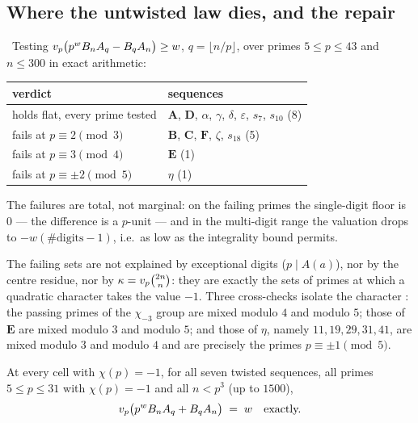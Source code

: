 \subsection{Where the untwisted law dies, and the repair}
\label{ssec:twist}

\begin{observation}\label{obs:naive-fail}
\Verified\ Testing $v_p\bigl(p^wB_nA_q-B_qA_n\bigr)\ge w$, $q=\lfloor n/p\rfloor$, over
primes $5\le p\le43$ and $n\le300$ in exact arithmetic:
\begin{center}\small
\begin{tabular}{@{}ll@{}}
\toprule
verdict & sequences\\
\midrule
holds flat, every prime tested & $\mathbf A$, $\mathbf D$, $\alpha$, $\gamma$, $\delta$, $\varepsilon$, $s_7$, $s_{10}$ \quad(8)\\
fails at $p\equiv2\pmod3$ & $\mathbf B$, $\mathbf C$, $\mathbf F$, $\zeta$, $s_{18}$ \quad(5)\\
fails at $p\equiv3\pmod4$ & $\mathbf E$ \quad(1)\\
fails at $p\equiv\pm2\pmod5$ & $\eta$ \quad(1)\\
\bottomrule
\end{tabular}
\end{center}
The failures are total, not marginal: on the failing primes the single-digit floor is $0$
--- the difference is a $p$-unit --- and in the multi-digit range the valuation drops to
$-w(\#\text{digits}-1)$, i.e.\ as low as the integrality bound permits.
\end{observation}

The failing sets are not explained by exceptional digits ($p\mid A(a)$), nor by the centre
residue, nor by $\kappa=v_p\binom{2n}{n}$: they are exactly the sets of primes at which a
quadratic character takes the value $-1$. Three cross-checks isolate the character
\Verified: the passing primes of the $\chi_{-3}$ group are mixed modulo $4$ and modulo
$5$; those of $\mathbf E$ are mixed modulo $3$ and modulo $5$; and those of $\eta$, namely
$11,19,29,31,41$, are mixed modulo $3$ and modulo $4$ and are precisely the primes
$p\equiv\pm1\pmod 5$.

\begin{observation}\label{obs:repair}
 At every cell with $\chi(p)=-1$, for all seven twisted
sequences, all primes $5\le p\le31$ with $\chi(p)=-1$ and all $n<p^3$ (up to $1500$),
\[
   v_p\bigl(p^{w}B_nA_q+B_qA_n\bigr)\;=\;w \quad\text{exactly.}
\]
\end{observation}

